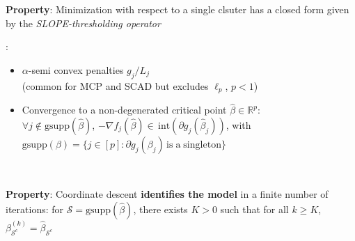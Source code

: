\documentclass[english,final,t]{beamer}
\newcommand{\bbR}{\mathbb{R}}
\newcommand{\cS}{\mathcal{S}}
\begin{document}
\begin{frame}{}
\begin{columns}[t]
\begin{column}{.3\linewidth}
\begin{block}{\textbf{\color{malgared}{\#1 Clusterwise minimization}}}
		\textbf{\textcolor{malgared}{Property}}: Minimization with respect to a single clsuter has a closed form given by the \emph{SLOPE-thresholding operator}
		\end{block}
	\begin{block}{\textbf{\color{malgared}{\# 2 Cluster identification}}}
		{\color{malgared}{Assumptions}}:
		\begin{itemize}
			\item
			$\alpha$-semi convex penalties $g_j / L_j$
			\\
			(common for MCP and SCAD but excludes $\ell_p$, $p<1$)
			\item
			Convergence to a non-degenerated critical point $\hat \beta \in \bbR^p$:\\
			 $\forall j \notin \mathrm{gsupp}(\hat \beta)$,
			$- \nabla f_j (\hat \beta) \in \, \mathrm{int}(\partial g_j(\hat \beta_j))$, with
			$\mathrm{gsupp}(\beta) = \{j \in [p]: \partial g_j(\beta_j) \, \mathrm{is \; a \; singleton}\}$
		\end{itemize}

		 \vspace{0.5em}

		\textbf{\color{malgared}Property}:  Coordinate descent \textbf{identifies the model} in a finite number of iterations: for $\cS = \mathrm{gsupp}(\hat \beta)$, there exists $K>0$ such that for all $k\geq K$, $\beta_{\cS^c}^{(k)} = \hat \beta_{\cS^c}$
		\end{block}
	\begin{block}{\textbf{\color{malgared}{Algorithm}}}

		\begin{algorithm}[H]
			\caption{%
			  Hybrid coordinate descent and proximal gradient descent algorithm
			  for SLOPE\label{alg:hybrid}}


\end{algorithm}
\end{block}
\end{column}
\end{columns}
\end{frame}
\end{document}
